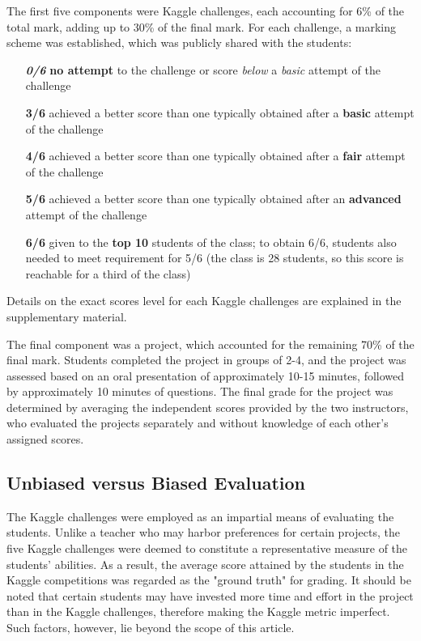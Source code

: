 \documentclass[a4paper]{article}
\begin{document}
	The first five components were Kaggle challenges, each accounting for 6\% of the total mark, adding up to 30\% of the final mark.
	For each challenge, a marking scheme was established, which was publicly shared with the students:
	\begin{itemize}
		\item [\textbf{\textit{0/6}}] \textbf{no attempt} to the challenge or score \textit{below} a \textit{basic} attempt of the challenge
		\item [\textbf{3/6}] achieved a better score than one typically obtained after a \textbf{basic} attempt of the challenge
		\item [\textbf{4/6}] achieved a better score than one typically obtained after a \textbf{fair} attempt of the challenge
		\item [\textbf{5/6}] achieved a better score than one typically obtained after an \textbf{advanced} attempt of the challenge
		\item [\textbf{6/6}] given to the \textbf{top 10} students of the class; to obtain 6/6, students also needed to meet requirement for 5/6 (the class is 28 students, so this score is reachable for a third of the class)

	\end{itemize}
	Details on the exact scores level for each Kaggle challenges are explained in the supplementary material.
	
	The final component was a project, which accounted for the remaining 70\% of the final mark.
	Students completed the project in groups of 2-4, and the project was assessed based on an oral presentation of approximately 10-15 minutes, followed by approximately 10 minutes of questions.
	The final grade for the project was determined by averaging the independent scores provided by the two instructors, who evaluated the projects separately and without knowledge of each other's assigned scores.
	
	\subsection{Unbiased versus Biased Evaluation}
	The Kaggle challenges were employed as an impartial means of evaluating the students.
	Unlike a teacher who may harbor preferences for certain projects, the five Kaggle challenges were deemed to constitute a representative measure of the students' abilities.
	As a result, the average score attained by the students in the Kaggle competitions was regarded as the "ground truth" for grading.
	It should be noted that certain students may have invested more time and effort in the project than in the Kaggle challenges, therefore making the Kaggle metric imperfect.
	Such factors, however, lie beyond the scope of this article.
	
\end{document}

